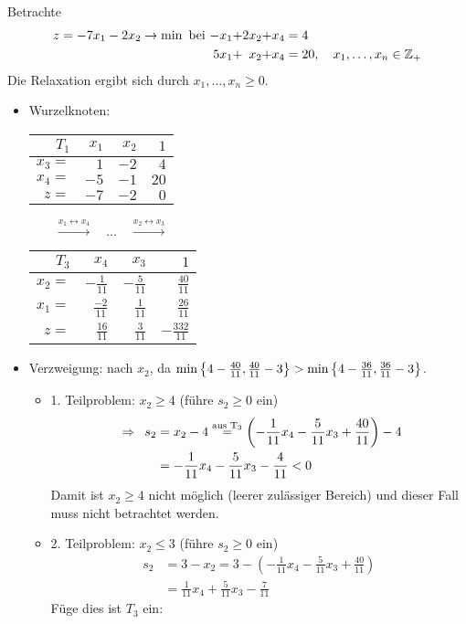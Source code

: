 \begin{beispiel}
	Betrachte 
	\begin{equation*}
	\begin{alignedat}{4}
		z = -7x_1 - 2x_2 \to \min \text{ bei } &&-x_1 &+ &2x_2 &+ &x_4 &= 4 \\
		&&5x_1 &+ &x_2 &+ &x_4 &= 20, \quad x_1, \dots, x_n \in \mathbb{Z}_+
	\end{alignedat}
	\end{equation*}
	Die Relaxation ergibt sich durch $x_1, \dots, x_n \ge 0$.
	\begin{itemize}[leftmargin=*]
		\item Wurzelknoten:
		\begin{center}
			\begin{tabular}{r|rr|r}
				$T_1$ & $x_1$ & $x_2$ & $1$ \\ \hline
				$x_3 = $ & $1$ & $-2$ & $4$ \\
				$x_4 = $ & $-5$ & $-1$ & $20$ \\ \hline
				$z = $   & $-7$ & $-2$ & $0$
			\end{tabular}
			$\qquad \overset{x_1 \leftrightarrow x_4}{\longrightarrow} \quad \dots \quad \overset{x_2 \leftrightarrow x_3}{\longrightarrow} \qquad$
			\begin{tabular}{r|rr|r}
				$T_3$ & $x_4$ & $x_3$ & $1$ \\ \hline
				$x_2 = $ & $-\frac{1}{11}$ & $-\frac{5}{11}$ & $\frac{40}{11}$ \\
				$x_1 = $ & $\frac{-2}{11}$ & $\frac{1}{11}$ & $\frac{26}{11}$ \\ \hline
				$z = $   & $\frac{16}{11}$ & $\frac{3}{11}$ & $-\frac{332}{11}$
			\end{tabular}
		\end{center}	
		\item Verzweigung: nach $x_2$, da $\min \left\{ 4-\frac{40}{11}, \frac{40}{11} - 3 \right\} > \min \left\{ 4 - \frac{36}{11}, \frac{36}{11} - 3 \right\}$. 
		\begin{itemize}
			\item 1. Teilproblem: $x_2 \ge 4$ (führe $s_2 \ge 0$ ein)
			\begin{equation*}
				\begin{aligned}
					\enskip \Rightarrow \enskip s_2 &= x_2 - 4 
					\overset{\text{aus T}_3}{=} \left( -\frac{1}{11}x_4 - \frac{5}{11} x_3 + \frac{40}{11} \right) - 4 \\
					&= -\frac{1}{11} x_4 - \frac{5}{11} x_3 - \frac{4}{11} < 0
				\end{aligned}
			\end{equation*}
			Damit ist $x_2 \ge 4$ nicht möglich (leerer zulässiger Bereich) und dieser Fall muss nicht betrachtet werden.
			\item 2. Teilproblem: $x_2 \le 3$ (führe $s_2 \ge 0$ ein)
			\begin{equation*}
				\begin{aligned}
					s_2 &= 3 - x_2 = 3 - (-\frac{1}{11} x_4 - \frac{5}{11} x_3 + \frac{40}{11}) \\
					&= \frac{1}{11} x_4 + \frac{5}{11} x_3 - \frac{7}{11}
				\end{aligned}
			\end{equation*}
			Füge dies ist $T_3$ ein:
			

\end{itemize}
\end{itemize}
\end{beispiel}
